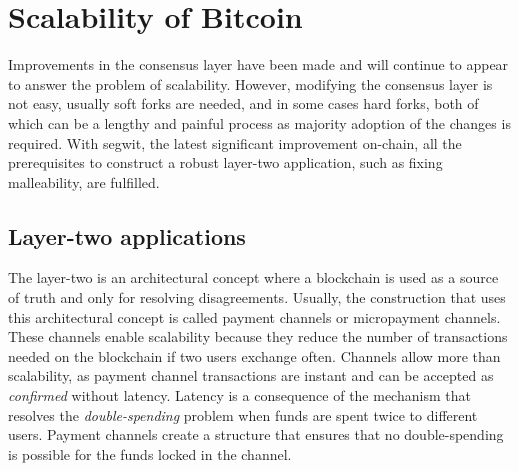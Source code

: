 \section{Scalability of Bitcoin}

Improvements in the consensus layer have been made and will continue to appear
to answer the problem of scalability. However, modifying the consensus layer is
not easy, usually soft forks are needed, and in some cases hard forks, both of which
can be a lengthy and painful process as majority adoption of the changes is required. With
\gls{segwit}, the latest significant improvement on-chain, all the prerequisites
to construct a robust layer-two application, such as fixing malleability, are
fulfilled.

\subsection{Layer-two applications}

The layer-two is an architectural concept where a blockchain is used as a source
of truth and only for resolving disagreements. Usually, the construction that
uses this architectural concept is called payment channels or micropayment
channels. These channels enable scalability because they reduce the number of
transactions needed on the blockchain if two users exchange often.
Channels allow more than scalability, as payment channel transactions are
instant and can be accepted as \textit{confirmed} without latency. Latency is a
consequence of the mechanism that resolves the \textit{double-spending} problem
when funds are spent twice to different users. Payment channels create a
structure that ensures that no double-spending is possible for the funds locked
in the channel.
